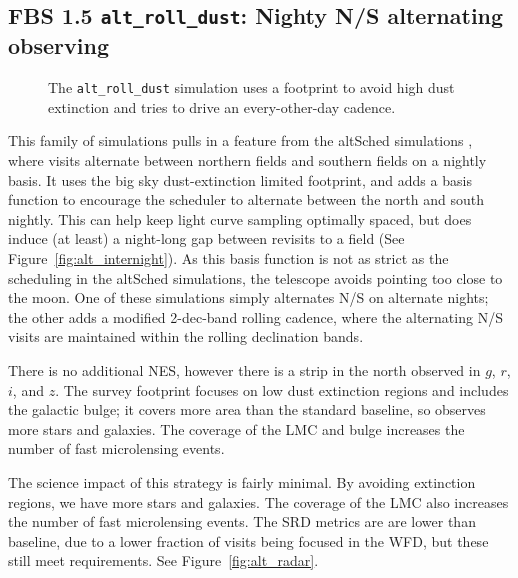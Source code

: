 \subsection{FBS 1.5  {\tt alt\_roll\_dust}: Nighty N/S alternating observing}\label{ss:alt_roll_dust}

\begin{figure}
\caption{The {\tt alt\_roll\_dust} simulation uses a footprint to avoid high dust extinction and tries to drive an every-other-day cadence.}\label{fig:altdust}
\end{figure}

This family of simulations pulls in a feature from the altSched simulations \citep{2019PASP..131k5002R}, where visits alternate between northern fields and southern fields on a nightly basis. It uses the big sky dust-extinction limited footprint, and adds a basis function to encourage the scheduler to alternate between the north and south nightly. This can help keep light curve sampling optimally spaced, but does induce (at least) a night-long gap between revisits to a field (See Figure~\ref{fig:alt_internight}). As this basis function is not as strict as the scheduling in the altSched simulations, the telescope avoids pointing too close to the moon. One of these simulations simply alternates N/S on alternate nights; the other adds a modified 2-dec-band rolling cadence, where the alternating N/S visits are maintained within the rolling declination bands. 

There is no additional NES, however there is a strip in the north observed in $g$, $r$, $i$, and $z$. The survey footprint focuses on low dust extinction regions and includes the galactic bulge; it covers more area than the standard baseline, so observes more stars and galaxies. The coverage of the LMC and bulge increases the number of fast microlensing events. 

The science impact of this strategy is fairly minimal. By avoiding extinction regions, we have more stars and galaxies. The coverage of the LMC also increases the number of fast microlensing events. The SRD metrics are are lower than baseline, due to a lower fraction of visits being focused in the WFD, but these still meet requirements. See Figure~\ref{fig:alt_radar}. 

